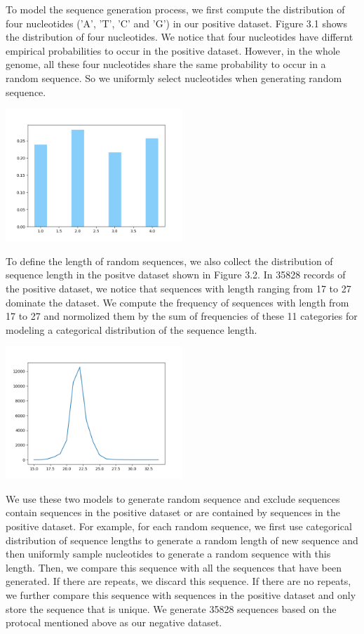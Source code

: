\documentclass[letterpaper, 11pt]{article}
\newenvironment{Figure}
  {\par\medskip\noindent\minipage{\linewidth}}
  {\endminipage\par\medskip}
\begin{document}
\begin{multicols*}{2}
{To model the sequence generation process, we first compute the distribution of four nucleotides ('A', 'T', 'C' and 'G') in our positive dataset. Figure 3.1 shows the distribution of four nucleotides. We notice that four nucleotides have differnt empirical probabilities to occur in the positive dataset. However, in the whole genome, all these four nucleotides share the same probability to occur in a random sequence. So we uniformly select nucleotides when generating random sequence. 
\begin{Figure}
\includegraphics[height=5cm, width=\textwidth]{ATCG.png}
\end{Figure}
To define the length of random sequences, we also collect the distribution of sequence length in the positve dataset shown in Figure 3.2. In 35828 records of the positive dataset, we notice that sequences with length ranging from 17 to 27 dominate the dataset. We compute the frequency of sequences with length from 17 to 27 and normolized them by the sum of frequencies of these 11 categories for modeling a categorical distribution of the sequence length.
\begin{Figure}
\includegraphics[height=5cm, width=\textwidth]{lendistribute.png}
\end{Figure}
We use these two models to generate random sequence and exclude sequences contain sequences in the positive dataset or are contained by sequences in the positive dataset. For example, for each random sequence, we first use categorical distribution of sequence lengths to generate a random length of new sequence and then uniformly sample nucleotides to generate a random sequence with this length. Then, we compare this sequence with all the sequences that have been generated. If there are repeats, we discard this sequence. If there are no repeats, we further compare this sequence with sequences in the positive dataset and only store the sequence that is unique. We generate 35828 sequences based on the protocal mentioned above as our negative dataset.
}
\end{multicols*}
\end{document}
